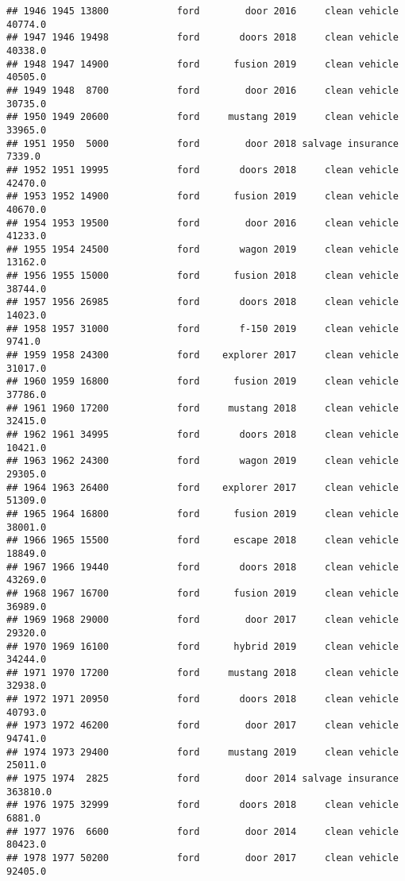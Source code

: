 \documentclass[
]{article}
\begin{document}
\begin{verbatim}
## 1946 1945 13800            ford        door 2016     clean vehicle   40774.0
## 1947 1946 19498            ford       doors 2018     clean vehicle   40338.0
## 1948 1947 14900            ford      fusion 2019     clean vehicle   40505.0
## 1949 1948  8700            ford        door 2016     clean vehicle   30735.0
## 1950 1949 20600            ford     mustang 2019     clean vehicle   33965.0
## 1951 1950  5000            ford        door 2018 salvage insurance    7339.0
## 1952 1951 19995            ford       doors 2018     clean vehicle   42470.0
## 1953 1952 14900            ford      fusion 2019     clean vehicle   40670.0
## 1954 1953 19500            ford        door 2016     clean vehicle   41233.0
## 1955 1954 24500            ford       wagon 2019     clean vehicle   13162.0
## 1956 1955 15000            ford      fusion 2018     clean vehicle   38744.0
## 1957 1956 26985            ford       doors 2018     clean vehicle   14023.0
## 1958 1957 31000            ford       f-150 2019     clean vehicle    9741.0
## 1959 1958 24300            ford    explorer 2017     clean vehicle   31017.0
## 1960 1959 16800            ford      fusion 2019     clean vehicle   37786.0
## 1961 1960 17200            ford     mustang 2018     clean vehicle   32415.0
## 1962 1961 34995            ford       doors 2018     clean vehicle   10421.0
## 1963 1962 24300            ford       wagon 2019     clean vehicle   29305.0
## 1964 1963 26400            ford    explorer 2017     clean vehicle   51309.0
## 1965 1964 16800            ford      fusion 2019     clean vehicle   38001.0
## 1966 1965 15500            ford      escape 2018     clean vehicle   18849.0
## 1967 1966 19440            ford       doors 2018     clean vehicle   43269.0
## 1968 1967 16700            ford      fusion 2019     clean vehicle   36989.0
## 1969 1968 29000            ford        door 2017     clean vehicle   29320.0
## 1970 1969 16100            ford      hybrid 2019     clean vehicle   34244.0
## 1971 1970 17200            ford     mustang 2018     clean vehicle   32938.0
## 1972 1971 20950            ford       doors 2018     clean vehicle   40793.0
## 1973 1972 46200            ford        door 2017     clean vehicle   94741.0
## 1974 1973 29400            ford     mustang 2019     clean vehicle   25011.0
## 1975 1974  2825            ford        door 2014 salvage insurance  363810.0
## 1976 1975 32999            ford       doors 2018     clean vehicle    6881.0
## 1977 1976  6600            ford        door 2014     clean vehicle   80423.0
## 1978 1977 50200            ford        door 2017     clean vehicle   92405.0

\end{verbatim}
\end{document}

